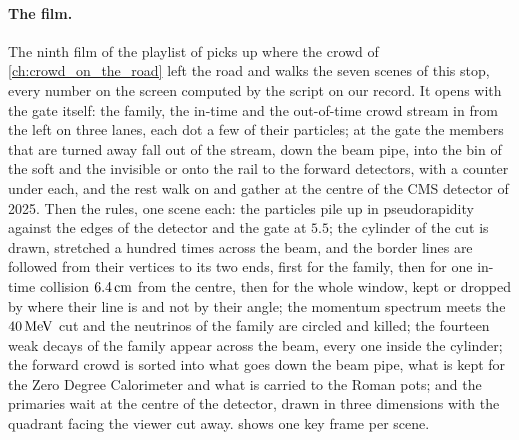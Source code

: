 \paragraph{The film.}
\label{sec:crossing_the_border:animation}
The ninth film of the playlist of \jitjetworld picks up where the crowd of
\cref{ch:crowd_on_the_road} left the road and walks the seven scenes of this
stop, every number on the screen computed by the script on our record. It
opens with the gate itself: the family, the in-time and the out-of-time
crowd stream in from the left on three lanes, each dot a few of their
particles; at the gate the members that are turned away fall out of the
stream, down the beam pipe, into the bin of the soft and the invisible or
onto the rail to the forward detectors, with a counter under each, and the
rest walk on and gather at the centre of the CMS detector of 2025. Then the
rules, one scene each: the particles pile up in pseudorapidity against the
edges of the detector and the gate at $5.5$; the cylinder of the cut is
drawn, stretched a hundred times across the beam, and the border lines are
followed from their vertices to its two ends, first for the family, then
for one in-time collision $6.4\,\mathrm{cm}$ from the centre, then for the whole
window, kept or dropped by where their line is and not by their angle; the
momentum spectrum meets the $40\,\mathrm{MeV}$ cut and the neutrinos of the family are
circled and killed; the fourteen weak decays of the family appear across
the beam, every one inside the cylinder; the forward crowd is sorted into
what goes down the beam pipe, what is kept for the Zero Degree Calorimeter
and what is carried to the Roman pots; and the primaries wait at the centre
of the detector, drawn in three dimensions with the quadrant facing the
viewer cut away.  shows one key frame
per scene.

